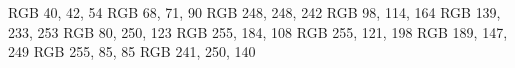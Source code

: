 \usepackage{graphicx}

\definecolor{draculabg}      {RGB} {40,   42,   54}
\definecolor{draculacl}      {RGB} {68,   71,   90}
\definecolor{draculafg}      {RGB} {248,  248,  242}
\definecolor{draculacomment} {RGB} {98,   114,  164}
\definecolor{draculacyan}    {RGB} {139,  233,  253}
\definecolor{draculagreen}   {RGB} {80,   250,  123}
\definecolor{draculaorange}  {RGB} {255,  184,  108}
\definecolor{draculapink}    {RGB} {255,  121,  198}
\definecolor{draculapurple}  {RGB} {189,  147,  249}
\definecolor{draculared}     {RGB} {255,  85,   85}
\definecolor{draculayellow}  {RGB} {241,  250,  140}

\pagecolor{draculabg}
\color{draculafg}
